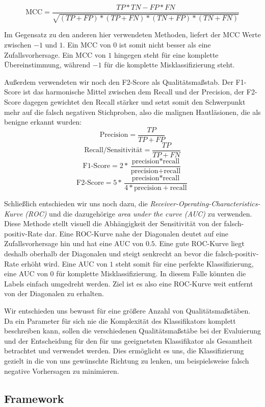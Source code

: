 \[\text{MCC} = \frac{TP*TN - FP*FN}{\sqrt{(TP+FP)*(TP+FN)*(TN+FP)*(TN+FN)}}\]

Im Gegensatz zu den anderen hier verwendeten Methoden, liefert der MCC Werte zwischen $-1$ und $1$. Ein MCC von $0$ ist somit nicht besser als eine Zufallsvorhersage. Ein MCC von $1$ hingegen steht für eine komplette Übereinstimmung, während $-1$ für die komplette Misklassifizierung steht.

Außerdem verwendeten wir noch den F2-Score als Qualitätsmaßstab. Der F1-Score ist das harmonische Mittel zwischen dem Recall und der Precision, der F2-Score dagegen gewichtet den Recall stärker und setzt somit den Schwerpunkt mehr auf die falsch negativen Stichproben, also die malignen Hautläsionen, die als benigne erkannt wurden:
	\[\text{Precision} = \frac{TP}{TP+FP}\]
    \[\text{Recall/Sensitivität} = \frac{TP}{TP+FN}\]
	\[\text{F1-Score} = 2*\frac{\text{precision}*\text{recall}}	{\text{precision}+\text{recall}}\]
   	\[\text{F2-Score} = 5*\frac{\text{precision}*\text{recall}}	{4*\text{precision}+\text{recall}}\]
    
Schließlich entschieden wir uns noch dazu, die \textit{Receiver-Operating-Characteristics-Kurve (ROC)} und die dazugehörige \textit{area under the curve (AUC)} zu verwenden. Diese Methode stellt visuell die Abhängigkeit der Sensitivität von der falsch-positiv-Rate dar. Eine ROC-Kurve nahe der Diagonalen deutet auf eine Zufallsvorhersage hin und hat eine AUC von $0.5$. Eine gute ROC-Kurve liegt deshalb oberhalb der Diagonalen und steigt senkrecht an bevor die falsch-positiv-Rate erhöht wird. Eine AUC von $1$ steht somit für eine perfekte Klassifizierung, eine AUC von $0$ für komplette Misklassifizierung. In diesem Falle könnten die Labels einfach umgedreht werden. Ziel ist es also eine ROC-Kurve weit entfernt von der Diagonalen zu erhalten.
    
Wir entschieden uns bewusst für eine größere Anzahl von Qualitätsmaßstäben. Da ein Parameter für sich nie die Komplexität des Klassifikators komplett beschreiben kann, sollen die verschiedenen Qualitätsmaßstäbe bei der Evaluierung und der Entscheidung für den für uns geeignetsten Klassifikator als Gesamtheit betrachtet und verwendet werden. Dies ermöglicht es uns, die Klassifizierung gezielt in die von uns gewünschte Richtung zu lenken, um beispielsweise falsch negative Vorhersagen zu minimieren.

\subsection{Framework}

